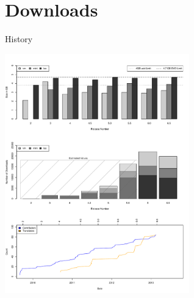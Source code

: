 \documentclass{beamer}
\newenvironment{reference}[2]{%
  \begin{textblock*}{\textwidth}(#1,#2) 
      \footnotesize\it\bgroup\color{black}}{\egroup\end{textblock*}}
\begin{document}
\section{Downloads}

\begin{frame}{History}
\vspace{-.25in}
	\begin{minipage}{\textwidth}
		\begin{center}
			\includegraphics[width=0.6\textwidth]{OSGeoLiveInfographic.pdf}
		\end{center}
	\end{minipage}
\end{frame}
\end{document}
